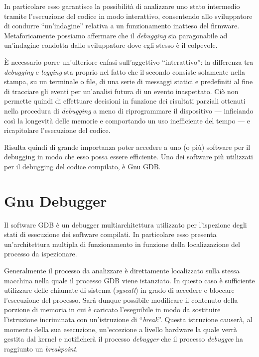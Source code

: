 In particolare esso garantisce la possibilità di analizzare uno stato intermedio tramite l'esecuzione del codice in modo interattivo, consentendo allo sviluppatore di condurre ``un'indagine'' relativa a un funzionamento inatteso del firmware. Metaforicamente possiamo affermare che il \textit{debugging} sia paragonabile ad un'indagine condotta dallo sviluppatore dove egli stesso è il colpevole.

È necessario porre un'ulteriore enfasi sull'aggettivo ``interattivo'': la differenza tra \textit{debugging} e \textit{logging} sta proprio nel fatto che il secondo consiste solamente nella stampa, su un terminale o file, di una serie di messaggi statici e predefiniti al fine di tracciare gli eventi per un'analisi futura di un evento inaspettato. Ciò non permette quindi di effettuare decisioni in funzione dei risultati parziali ottenuti nella procedura di \textit{debugging} a meno di riprogrammare il dispositivo --- inficiando così la longevità delle memorie e comportando un uso inefficiente del tempo --- e ricapitolare l'esecuzione del codice.

Risulta quindi di grande importanza poter accedere a uno (o più) software per il debugging in modo che esso possa essere efficiente.
Uno dei software più utilizzati per il debugging del codice compilato, è Gnu GDB\cite{site:gdb}.

\section{Gnu Debugger}\label{sec:gdb}

Il software GDB è un debugger multiarchitettura\cite{site:gdb} utilizzato per l'ispezione degli stati di esecuzione dei software compilati.
In particolare esso presenta un'architettura multipla di funzionamento in funzione della localizzazione del processo da ispezionare.

Generalmente il processo da analizzare è direttamente localizzato sulla stessa macchina nella quale il processo GDB viene istanziato. In questo caso è sufficiente utilizzare delle chiamate di sistema (\textit{syscall}) in grado di accedere e bloccare l'esecuzione del processo.
Sarà dunque possibile modificare il contenuto della porzione di memoria in cui è caricato l'eseguibile in modo da sostituire l'istruzione incriminata con un'istruzione di ``\textit{break}''. Questa istruzione causerà, al momento della sua esecuzione, un'eccezione a livello hardware la quale verrà gestita dal kernel e notificherà il processo \textit{debugger} che il processo \textit{debuggee} ha raggiunto un \textit{breakpoint}.

